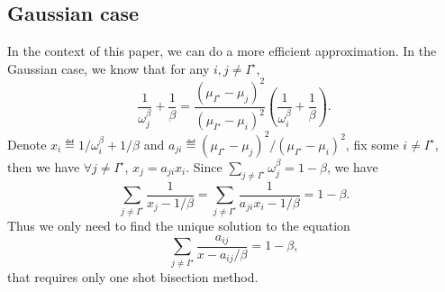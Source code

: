 \subsection{Gaussian case}

In the context of this paper, we can do a more efficient approximation. In the Gaussian case, we know that for any $i,j\neq I^\star$,
\[
    \frac{1}{\omega_j^\beta} + \frac{1}{\beta} = \frac{(\mu_{I^\star}-\mu_j)^2}{(\mu_{I^\star}-\mu_i)^2}\left(\frac{1}{\omega_i^\beta} + \frac{1}{\beta}\right).
\]
Denote $x_i\eqdef 1/\omega_i^\beta+1/\beta$ and $a_{ji}\eqdef (\mu_{I^\star}-\mu_j)^2/(\mu_{I^\star}-\mu_i)^2$, fix some $i\neq I^\star$, then we have $\forall j\neq I^\star$, $x_j = a_{ji}x_i$. Since $\sum_{j\neq I^\star} \omega_j^\beta = 1-\beta$, we have
\[
    \sum_{j\neq I^\star} \frac{1}{x_j-1/\beta} = \sum_{j\neq I^\star} \frac{1}{a_{ji}x_i-1/\beta} = 1-\beta.
\]
Thus we only need to find the unique solution to the equation
\[
    \sum_{j\neq I^\star} \frac{a_{ij}}{x-a_{ij}/\beta} = 1-\beta,
\]
that requires only one shot bisection method.
